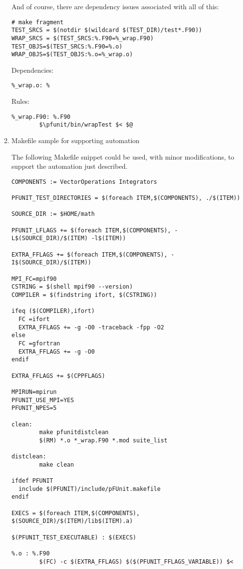 \documentclass[10pt]{article}
\newcommand{\pfunit}{{\sc pFUnit }}
\begin{document}
\begin{enumerate}
And of course, there are dependency issues associated with all of this:

\begin{verbatim}
# make fragment
TEST_SRCS = $(notdir $(wildcard $(TEST_DIR)/test*.F90))
WRAP_SRCS = $(TEST_SRCS:%.F90=%_wrap.F90)
TEST_OBJS=$(TEST_SRCS:%.F90=%.o)
WRAP_OBJS=$(TEST_OBJS:%.o=%_wrap.o)
\end{verbatim}

Dependencies:
\begin{verbatim}
%_wrap.o: %
\end{verbatim}

Rules:
\begin{verbatim}
%_wrap.F90: %.F90
        $\pfunit/bin/wrapTest $< $@
\end{verbatim}

\item Makefile sample for supporting automation

The following Makefile snippet could be used, with minor
modifications, to support the automation just described. 

\begin{verbatim}
COMPONENTS := VectorOperations Integrators 

PFUNIT_TEST_DIRECTORIES = $(foreach ITEM,$(COMPONENTS), ./$(ITEM))

SOURCE_DIR := $HOME/math

PFUNIT_LFLAGS += $(foreach ITEM,$(COMPONENTS), -L$(SOURCE_DIR)/$(ITEM) -l$(ITEM))

EXTRA_FFLAGS += $(foreach ITEM,$(COMPONENTS), -I$(SOURCE_DIR)/$(ITEM))

MPI_FC=mpif90
CSTRING = $(shell mpif90 --version)
COMPILER = $(findstring ifort, $(CSTRING))

ifeq ($(COMPILER),ifort)
  FC =ifort
  EXTRA_FFLAGS += -g -O0 -traceback -fpp -O2 
else
  FC =gfortran
  EXTRA_FFLAGS += -g -O0 
endif

EXTRA_FFLAGS += $(CPPFLAGS)

MPIRUN=mpirun
PFUNIT_USE_MPI=YES
PFUNIT_NPES=5

clean: 
        make pfunitdistclean
        $(RM) *.o *_wrap.F90 *.mod suite_list

distclean:
        make clean

ifdef PFUNIT
  include $(PFUNIT)/include/pFUnit.makefile
endif

EXECS = $(foreach ITEM,$(COMPONENTS), $(SOURCE_DIR)/$(ITEM)/lib$(ITEM).a)

$(PFUNIT_TEST_EXECUTABLE) : $(EXECS)

%.o : %.F90
        $(FC) -c $(EXTRA_FFLAGS) $($(PFUNIT_FFLAGS_VARIABLE)) $<

\end{verbatim}

\end{enumerate}
\end{document}
